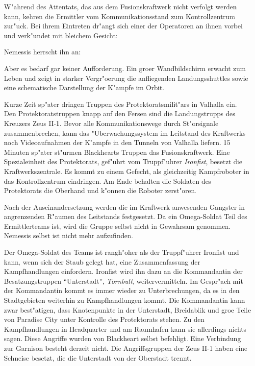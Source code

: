 
W"ahrend des Attentats, das aus dem Fusionskraftwerk nicht verfolgt werden kann, kehren die Ermittler vom Kommunikationsstand zum Kontrollzentrum zur"uck. Bei ihrem Eintreten dr"angt sich einer der Operatoren an ihnen vorbei und verk"undet mit bleichem Gesicht:

 Nemessis herrscht ihn an: 

Aber es bedarf gar keiner Aufforderung. Ein gro\3er Wandbildschirm erwacht zum Leben und zeigt in starker Vergr"o\3erung die anfliegenden Landungsshuttles sowie eine schematische Darstellung der K"ampfe im Orbit.

Kurze Zeit sp"ater dringen Truppen des Protektoratsmilit"ars in Valhalla ein. Den Protektoratstruppen knapp auf den Fersen sind die Landungstrupps des Kreuzers Zeus II-1. Bevor alle Kommunikationswege durch St"orsignale zusammenbrechen, kann das "Uberwachungssystem im Leitstand des Kraftwerks noch Videoaufnahmen der K"ampfe in den Tunneln von Valhalla liefern. 15 Minuten sp"ater st"urmen Blackhearts Truppen das Fusionskraftwerk. Eine Spezialeinheit des Protektorats, gef"uhrt vom Truppf"uhrer \emph{Ironfist}, besetzt die Kraftwerkszentrale. Es kommt zu einem Gefecht, als gleichzeitig Kampfroboter in das Kontrollzentrum eindringen. Am Ende behalten die Soldaten des Protektorats die Oberhand und k"onnen die Roboter zerst"oren.

Nach der Auseinandersetzung werden die im Kraftwerk anwesenden Gangster in angrenzenden R"aumen des Leitstands festgesetzt. Da ein Omega-Soldat Teil des Ermittlerteams ist, wird die Gruppe selbst nicht in Gewahrsam genommen. Nemessis selbst ist nicht mehr aufzufinden.

Der Omega-Soldat des Teams ist rangh"oher als der Truppf"uhrer Ironfist und kann, wenn sich der Staub gelegt hat, eine Zusammenfassung der Kampfhandlungen einfordern. Ironfist wird ihn dazu an die Kommandantin der Besatzungstruppen ``Unterstadt'', \emph{Tornbull}, weitervermitteln. Im Gespr"ach mit der Kommandantin kommt es immer wieder zu Unterbrechungen, da es in den Stadtgebieten weiterhin zu Kampfhandlungen kommt. Die Kommandantin kann zwar best"atigen, dass Knotenpunkte in der Unterstadt, Breidablik und gro\3e Teile von Paradise City unter Kontrolle des Protektorats stehen. Zu den Kampfhandlungen in Headquarter und am Raumhafen kann sie allerdings nichts sagen. Diese Angriffe wurden von Blackheart selbst befehligt. Eine Verbindung zur Garnison besteht derzeit nicht. Die Angriffsgruppen der Zeus II-1 haben eine Schneise besetzt, die die Unterstadt von der Oberstadt trennt.

